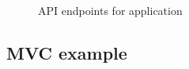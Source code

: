 \documentclass[12pt]{article} %
\begin{document}
	\begin{figure}[H] %
	\caption{API endpoints for application}
	\label{API)}
	\end{figure}

\subsection{MVC example}
\end{document}
